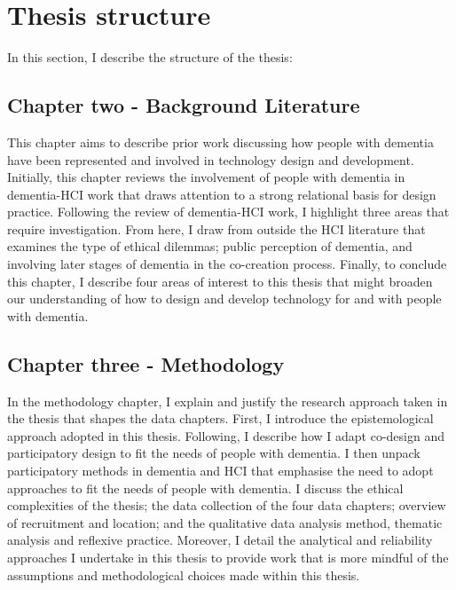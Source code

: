 \section{Thesis structure}
\label{Intro: Thesis structure}
In this section, I describe the structure of the thesis:

\subsection{Chapter two - Background Literature}
\label{Intro:ChapterTwo}
This chapter aims to describe prior work discussing how people with dementia have been represented and involved in technology design and development. Initially, this chapter reviews the involvement of people with dementia in dementia-HCI work that draws attention to a strong relational basis for design practice. Following the review of dementia-HCI work, I highlight three areas that require investigation. From here, I draw from outside the HCI literature that examines the type of ethical dilemmas; public perception of dementia, and involving later stages of dementia in the co-creation process. Finally, to conclude this chapter, I describe four areas of interest to this thesis that might broaden our understanding of how to design and develop technology for and with people with dementia.

\subsection{Chapter three - Methodology}
\label{Intro:ChapterThree}
In the methodology chapter, I explain and justify the research approach taken in the thesis that shapes the data chapters. First, I introduce the epistemological approach adopted in this thesis. Following, I describe how I adapt co-design and participatory design to fit the needs of people with dementia. I then unpack participatory methods in dementia and HCI that emphasise the need to adopt approaches to fit the needs of people with dementia. I discuss the ethical complexities of the thesis; the data collection of the four data chapters; overview of recruitment and location; and the qualitative data analysis method, thematic analysis and reflexive practice. Moreover, I detail the analytical and reliability approaches I undertake in this thesis to provide work that is more mindful of the assumptions and methodological choices made within this thesis.

